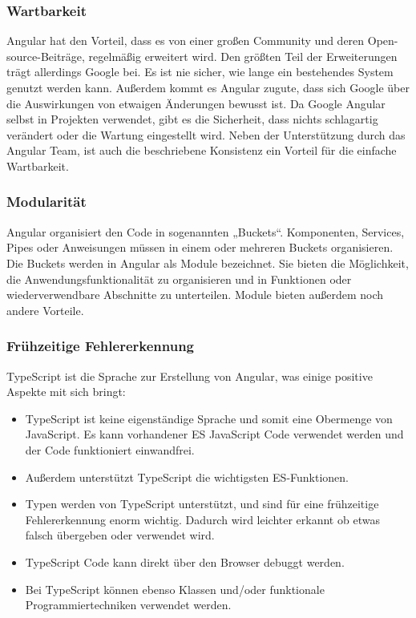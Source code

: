 \subsubsection{Wartbarkeit}
Angular hat den Vorteil, dass es von einer großen Community und deren Open-source-Beiträge, regelmäßig erweitert wird. Den größten Teil der Erweiterungen trägt allerdings Google bei. Es ist nie sicher, wie lange ein bestehendes System genutzt werden kann. Außerdem kommt es Angular zugute, dass sich Google über die Auswirkungen von etwaigen Änderungen bewusst ist. Da Google Angular selbst in Projekten verwendet, gibt es die Sicherheit, dass nichts schlagartig verändert oder die Wartung eingestellt wird. Neben der Unterstützung durch das Angular Team, ist auch die beschriebene Konsistenz ein Vorteil für die einfache Wartbarkeit.

\subsubsection{Modularität}
Angular organisiert den Code in sogenannten „Buckets“. Komponenten, Services, Pipes oder Anweisungen müssen in einem oder mehreren Buckets organisieren. Die Buckets werden in Angular als Module bezeichnet. Sie bieten die Möglichkeit, die Anwendungsfunktionalität zu organisieren und in Funktionen oder wiederverwendbare Abschnitte zu unterteilen. Module bieten außerdem noch andere Vorteile. 

\subsubsection{Frühzeitige Fehlererkennung}
TypeScript ist die Sprache zur Erstellung von Angular, was einige positive Aspekte mit sich bringt:

\begin{itemize}
  \item TypeScript ist keine eigenständige Sprache und somit eine Obermenge von JavaScript. Es kann vorhandener ES JavaScript Code verwendet werden und der Code funktioniert einwandfrei.
  \item Außerdem unterstützt TypeScript die wichtigsten ES-Funktionen.
  \item Typen werden von TypeScript unterstützt, und sind für eine frühzeitige Fehlererkennung enorm wichtig. Dadurch wird leichter erkannt ob etwas falsch übergeben oder verwendet wird.
  \item TypeScript Code kann direkt über den Browser debuggt werden.
  \item Bei TypeScript können ebenso Klassen und/oder funktionale Programmiertechniken verwendet werden.
\end{itemize}

